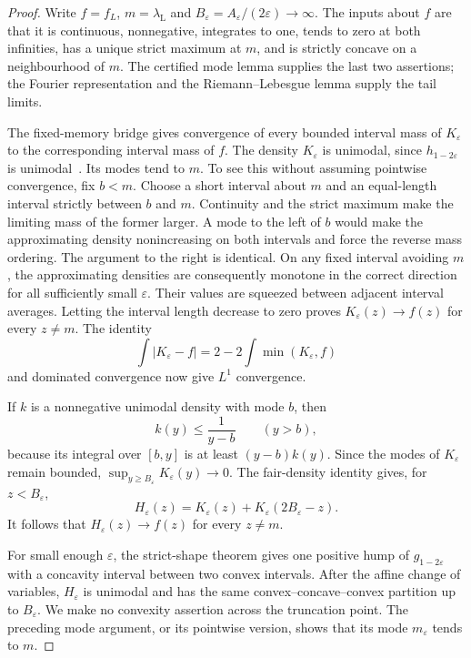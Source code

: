 \begin{proof}
Write $f=f_L$, $m=\lambda_{\mathrm L}$ and
$B_\varepsilon=A_\varepsilon/(2\varepsilon)\to\infty$.
The inputs about $f$ are that it is continuous, nonnegative, integrates to
one, tends to zero at both infinities, has a unique strict maximum at $m$,
and is strictly concave on a neighbourhood of $m$. The certified mode
lemma supplies the last two assertions; the Fourier representation and
the Riemann--Lebesgue lemma supply the tail limits.

The fixed-memory bridge gives convergence of every bounded interval mass
of $K_\varepsilon$ to the corresponding interval mass of $f$.
The density $K_\varepsilon$ is unimodal, since $h_{1-2\varepsilon}$ is
unimodal~\cite{glrs2025}. Its modes tend to $m$. To see this without assuming
pointwise convergence, fix $b<m$. Choose a short interval about $m$ and
an equal-length interval strictly between $b$ and $m$. Continuity and the
strict maximum make the limiting mass of the former larger. A mode to
the left of $b$ would make the approximating density nonincreasing on
both intervals and force the reverse mass ordering. The argument to
the right is identical. On any fixed interval avoiding $m$, the
approximating densities are consequently monotone in the correct
direction for all sufficiently small $\varepsilon$. Their values are
squeezed between adjacent interval averages. Letting the interval length
decrease to zero proves
$K_\varepsilon(z)\to f(z)$ for every $z\ne m$.
The identity
\[
 \int|K_\varepsilon-f|
   =2-2\int\min(K_\varepsilon,f)
\]
and dominated convergence now give $L^1$ convergence.

If $k$ is a nonnegative unimodal density with mode $b$, then
\[
 k(y)\le \frac1{y-b}\qquad(y>b),
\]
because its integral over $[b,y]$ is at least $(y-b)k(y)$.
Since the modes of $K_\varepsilon$ remain bounded,
$\sup_{y\ge B_\varepsilon}K_\varepsilon(y)\to0$.
The fair-density identity gives, for $z<B_\varepsilon$,
\[
 H_\varepsilon(z)
   =K_\varepsilon(z)+K_\varepsilon(2B_\varepsilon-z).
\]
It follows that $H_\varepsilon(z)\to f(z)$ for every $z\ne m$.

For small enough $\varepsilon$, the strict-shape theorem gives one
positive hump of $g_{1-2\varepsilon}$ with a concavity interval between
two convex intervals. After the affine change of variables,
$H_\varepsilon$ is unimodal and has the same convex--concave--convex
partition up to $B_\varepsilon$. We make no convexity assertion across
the truncation point. The preceding mode argument, or its pointwise
version, shows that its mode $m_\varepsilon$ tends to $m$.


\end{proof}
